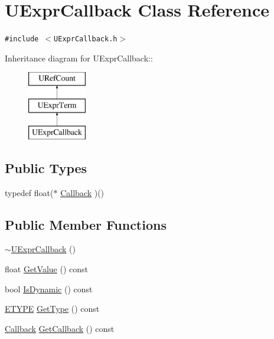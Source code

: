 \hypertarget{class_u_expr_callback}{
\section{UExprCallback Class Reference}
\label{class_u_expr_callback}
}
{\tt \#include $<$UExprCallback.h$>$}

Inheritance diagram for UExprCallback::\begin{figure}[H]
\begin{center}
\leavevmode
\includegraphics[height=3cm]{class_u_expr_callback}
\end{center}
\end{figure}
\subsection*{Public Types}
\begin{CompactItemize}
\item 
typedef float($\ast$ \hyperlink{class_u_expr_callback_d059184ad045fcaaa0022a4b4b4088b2}{Callback} )()
\end{CompactItemize}
\subsection*{Public Member Functions}
\begin{CompactItemize}
\item 
\hyperlink{class_u_expr_callback_4ef7a1d337f8c5a924658dcfb1baf81f}{$\sim$UExprCallback} ()
\item 
float \hyperlink{class_u_expr_callback_22d3eb12a6a7176ba982a4b6b7c56029}{GetValue} () const 
\item 
bool \hyperlink{class_u_expr_callback_eaae0abe4fc4f6c9a1bda718a6d61977}{IsDynamic} () const 
\item 
\hyperlink{class_u_expr_term_20f132fb3c5e0228623e4268ba0d06c2}{ETYPE} \hyperlink{class_u_expr_callback_231e95e9e737d1ecfa27c5bb6a660be8}{GetType} () const 
\item 
\hyperlink{class_u_expr_callback_d059184ad045fcaaa0022a4b4b4088b2}{Callback} \hyperlink{class_u_expr_callback_c99164cc38dc11ed0a70d80b52619131}{GetCallback} () const 
\end{CompactItemize}
